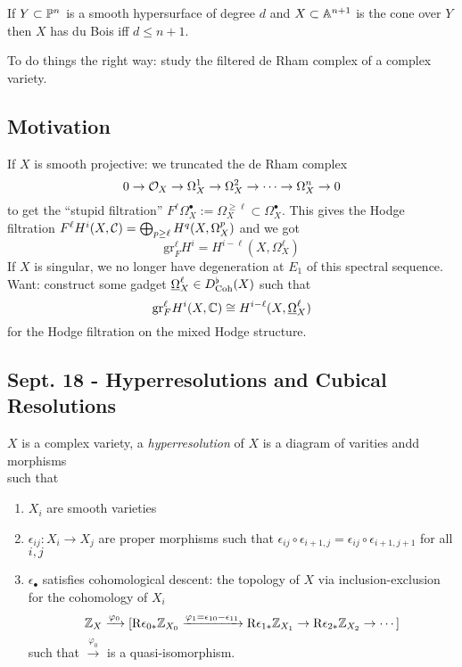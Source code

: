 \documentclass[12pt]{article}
\renewcommand{\gr}{\mathrm{gr}}
\newcommand{\R}{\mathrm{R}}
\begin{document}
\begin{exercise}
If $Y \subset \P^n$ is a smooth hypersurface of degree $d$ and $X \subset \A^{n+1}$ is the cone over $Y$ then $X$ has du Bois iff $d \le n + 1$. 
\end{exercise}

To do things the right way: study the filtered de Rham complex of a complex variety. 

\subsection{Motivation}

If $X$ is smooth projective: we truncated the de Rham complex
\[ 0 \to \struct{X} \to \Omega_X^1 \to \Omega_X^2 \to \cdots \to \Omega_X^n \to 0 \]
to get the ``stupid filtration'' $F^\ell \Omega_X^\bullet := \Omega^{\ge \ell}_X \subset \Omega^\bullet_X$. This gives the Hodge filtration $F^\ell H^i(X, \C) = \bigoplus_{p \ge \ell} H^q(X, \Omega_X^p)$ and we got
\[ \gr_F^\ell H^i = H^{i - \ell}(X, \Omega_X^\ell) \]
If $X$ is singular, we no longer have degeneration at $E_1$ of this spectral sequence. 
\bigskip\\
Want: construct some gadget $\ul{\Omega}_X^\ell \in D^\flat_{\mathrm{Coh}}(X)$ such that
\[ \gr_F^\ell H^i(X, \CC) \cong H^{i - \ell}(X, \ul{\Omega}_X^\ell) \]
for the Hodge filtration on the mixed Hodge structure. 

\subsection{Sept. 18 - Hyperresolutions and Cubical Resolutions}

\begin{defn}[Deligne]
$X$ is a complex variety, a \textit{hyperresolution} of $X$ is a diagram of varities andd morphisms 
\[ \]
such that
\begin{enumerate}
\item $X_i$ are smooth varieties
\item $\epsilon_{ij} : X_i \to X_j$ are proper morphisms such that $\epsilon_{ij} \circ \epsilon_{i+1,j} = \epsilon_{ij}  \circ \epsilon_{i+1,j+1}$ for all $i,j$
\item $\epsilon_\bullet$ satisfies cohomological descent: the topology of $X$ via inclusion-exclusion for the cohomology of $X_i$
\[ \Z_X \xrightarrow{\varphi_0} [\R \epsilon_{0 *} \Z_{X_0} \xrightarrow{\varphi_1 = \epsilon_{10} - \epsilon_{11}} \R \epsilon_{1 *} \Z_{X_1} \to \R \epsilon_{2 *} \Z_{X_2} \to \cdots] \]
such that $\xrightarrow{\varphi_0}$ is a quasi-isomorphism.
\end{enumerate}
\end{defn}
\end{document}
